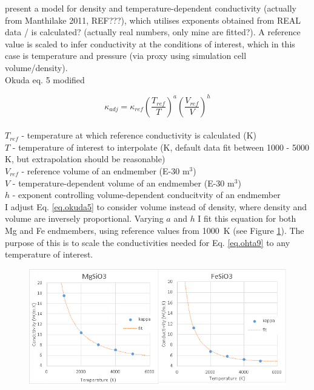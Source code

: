\citet{Okuda2017} present a model for density and temperature-dependent conductivity (actually from Manthilake 2011, REF???), which utilises exponents obtained from REAL data / is calculated? (actually real numbers, only mine are fitted?). A reference value is scaled to infer conductivity at the conditions of interest, which in this case is temperature and pressure (via proxy using simulation cell volume/density).\\



Okuda eq. 5 modified

\begin{equation}%
\kappa_{adj}=\kappa_{ref}\left ( \frac{T_{ref}}{T} \right )^{a}\left ( \frac{V_{ref}}{V} \right )^{h}
\label{eq.okuda_mod}
\end{equation}%
\\ $T_{ref}$ - temperature at which reference conductivity is calculated (K)\\
$T$ - temperature of interest to interpolate (K, default data fit between 1000 - 5000 K, but extrapolation should be reasonable)\\   
$V_{ref}$ - reference volume of an endmember (E-30 m$^3$)\\
$V$ - temperature-dependent volume of an endmember (E-30 m$^3$)\\
$h$ - exponent controlling volume-dependent conducitvity of an endmember\\

I adjust Eq. \ref{eq.okuda5} to consider volume instead of density, where density and volume are inversely proportional. Varying $a$ and $h$ I fit this equation for both Mg and Fe endmembers, using reference values from 1000~K (see Figure \ref{fig:draft_kt}). The purpose of this is to scale the conductivities needed for Eq. \ref{eq.ohta9} to any temperature of interest.

\begin{figure}[h]
  \includegraphics[width=\linewidth]{Figures/draft_kT.png}
  \caption{}
  \label{fig:draft_kt}
\end{figure}








